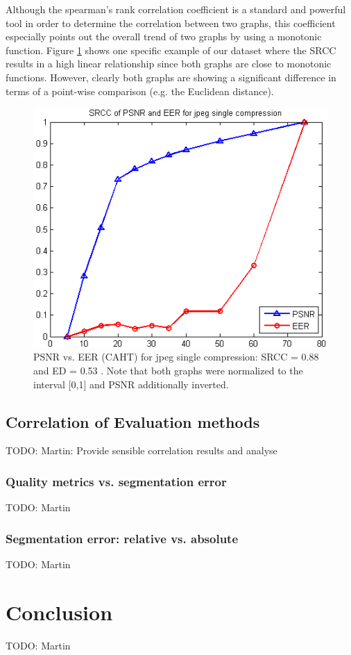 \documentclass[10pt,twocolumn,letterpaper]{article}
\begin{document}
Although the spearman’s rank correlation coefficient is a standard and powerful tool in order to determine the correlation between two graphs, this coefficient especially points out the overall trend of two graphs by using a monotonic function. Figure \ref{fig:corrSRCCproblem} shows one specific example of our dataset where the SRCC results in a high linear relationship since both graphs are close to monotonic functions. However, clearly both graphs are showing a significant difference in terms of a point-wise comparison (e.g. the Euclidean distance).

\begin{figure}[h]
	\begin{center}
		
	\includegraphics[width=1\linewidth]{img/corrSRCCproblem}
\end{center}
	\caption{PSNR vs. EER (CAHT) for jpeg single compression: SRCC = 0.88 and ED = 0.53 . Note that both graphs were normalized to the interval [0,1] and PSNR additionally inverted.}
	\label{fig:corrSRCCproblem}
	
\end{figure}

\subsection{Correlation of Evaluation methods}
TODO: Martin:
Provide sensible correlation results and analyse

\subsubsection{Quality metrics vs. segmentation error}
TODO: Martin

\subsubsection{Segmentation error: relative vs. absolute}
TODO: Martin


\section{Conclusion}
\label{section:conclusion}
TODO: Martin 

{\small


}
\end{document}
